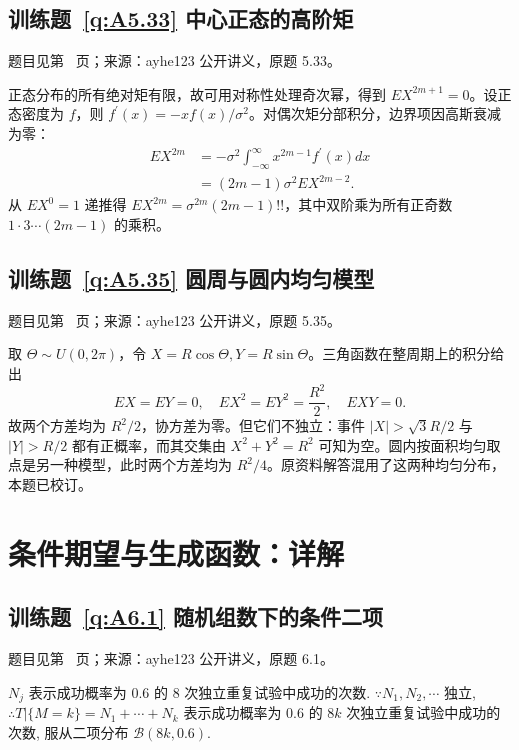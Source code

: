 \subsection*{训练题~\ref{q:A5.33} 中心正态的高阶矩}\label{a:A5.33}{\small 题目见第~\pageref{q:A5.33} 页；来源：ayhe123 公开讲义，原题 5.33。}
\begin{solve}正态分布的所有绝对矩有限，故可用对称性处理奇次幂，得到 $EX^{2m+1}=0$。设正态密度为 $f$，则 $f^{\prime}(x)=-xf(x)/\sigma^2$。对偶次矩分部积分，边界项因高斯衰减为零：\[\begin{aligned}EX^{2m}&=-\sigma^2\int_{-\infty}^{\infty}x^{2m-1}f^{\prime}(x)dx\\&=(2m-1)\sigma^2EX^{2m-2}.\end{aligned}\]从 $EX^0=1$ 递推得 $EX^{2m}=\sigma^{2m}(2m-1)!!$，其中双阶乘为所有正奇数 $1\cdot3\cdots(2m-1)$ 的乘积。\end{solve}

\subsection*{训练题~\ref{q:A5.35} 圆周与圆内均匀模型}\label{a:A5.35}{\small 题目见第~\pageref{q:A5.35} 页；来源：ayhe123 公开讲义，原题 5.35。}
\begin{solve}取 $\Theta\sim U(0,2\pi)$，令 $X=R\cos\Theta,Y=R\sin\Theta$。三角函数在整周期上的积分给出\[EX=EY=0,\quad EX^2=EY^2=\frac{R^2}{2},\quad EXY=0.\]故两个方差均为 $R^2/2$，协方差为零。但它们不独立：事件 $|X|>\sqrt3R/2$ 与 $|Y|>R/2$ 都有正概率，而其交集由 $X^2+Y^2=R^2$ 可知为空。圆内按面积均匀取点是另一种模型，此时两个方差均为 $R^2/4$。原资料解答混用了这两种均匀分布，本题已校订。\end{solve}

\clearpage\section*{条件期望与生成函数：详解}

\subsection*{训练题~\ref{q:A6.1} 随机组数下的条件二项}\label{a:A6.1}{\small 题目见第~\pageref{q:A6.1} 页；来源：ayhe123 公开讲义，原题 6.1。}
\begin{solve}
    $N_j$ 表示成功概率为 $0.6$ 的 $8$ 次独立重复试验中成功的次数. $\because N_1,N_2,\cdots$ 独立, $\therefore T|\{M=k\}=N_1+\cdots+N_k$ 表示成功概率为 $0.6$ 的 $8k$ 次独立重复试验中成功的次数, 服从二项分布 $\mathcal{B}(8k,0.6)$.
\end{solve}

